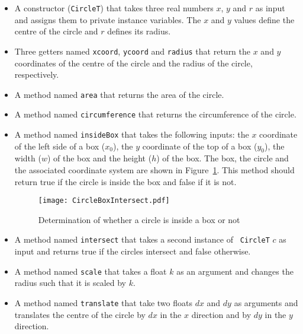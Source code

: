 \documentclass[12pt]{article}
\begin{document}
\begin{itemize}
\item A constructor ({\tt CircleT}) that takes three real numbers $x$, $y$
  and $r$ as input and assigns them to private instance variables.  The $x$ and
  $y$ values define the centre of the circle and $r$ defines its radius.
\item Three getters named {\tt xcoord}, {\tt ycoord} and {\tt radius} that
  return the $x$ and $y$ coordinates of the centre of the circle and the radius
  of the circle, respectively.
\item A method named {\tt area} that returns the area of the circle.
\item A method named {\tt circumference} that returns the circumference of the circle.
\item A method named {\tt insideBox} that takes the following inputs: 
  the $x$ coordinate of the left side of a box
  ($x_0$), the $y$ coordinate of the top of a box ($y_0$), the width ($w$) of
  the box and the height ($h$) of the box.  The box, the circle and the
  associated coordinate system are shown in Figure~\ref{Fig_CircleBoxIntersect}.
  This method should return true if the circle is inside the box and false if
  it is not.
\begin{figure}
\begin{center}
{
 \texttt{[image: CircleBoxIntersect.pdf]}
}
\caption{\label{Fig_CircleBoxIntersect} Determination of whether a circle is
  inside a box or not}
\end{center}
\end{figure}
\item A method named {\tt intersect} that takes a second instance of {\tt
    CircleT} $c$ as input and returns true if the circles intersect and false
  otherwise.
\item A method named {\tt scale} that takes a float $k$ as an argument 
  and changes the radius such that it is scaled by $k$.
\item A method named {\tt translate} that take two floats $dx$ and $dy$ as
  arguments and translates the centre of the circle by $dx$ in the $x$ direction
  and by $dy$ in the $y$ direction.
\end{itemize}
\end{document}
